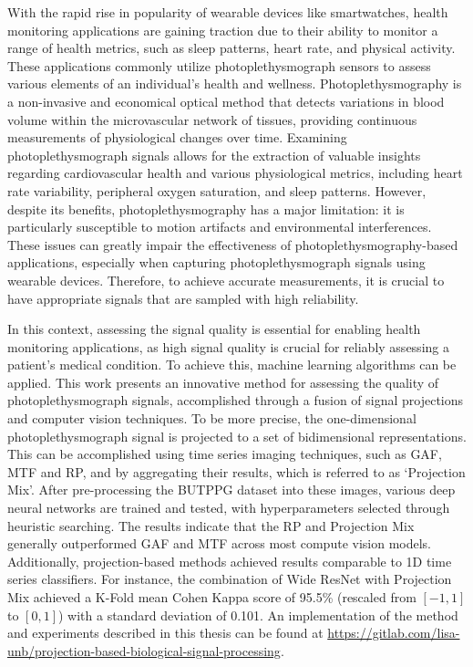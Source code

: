 

With the rapid rise in popularity of wearable devices like smartwatches, health monitoring applications are gaining traction due to their ability to monitor a range of health metrics, such as sleep patterns, heart rate, and physical activity. These applications commonly utilize photoplethysmograph sensors to assess various elements of an individual's health and wellness. Photoplethysmography is a non-invasive and economical optical method that detects variations in blood volume within the microvascular network of tissues, providing continuous measurements of physiological changes over time. Examining photoplethysmograph signals allows for the extraction of valuable insights regarding cardiovascular health and various physiological metrics, including heart rate variability, peripheral oxygen saturation, and sleep patterns. However, despite its benefits, photoplethysmography has a major limitation: it is particularly susceptible to motion artifacts and environmental interferences. These issues can greatly impair the effectiveness of photoplethysmography-based applications, especially when capturing photoplethysmograph signals using wearable devices. Therefore, to achieve accurate measurements, it is crucial to have appropriate signals that are sampled with high reliability.

In this context, assessing the signal quality is essential for enabling health monitoring applications, as high signal quality is crucial for reliably assessing a patient’s medical condition. To achieve this, machine learning algorithms can be applied. This work presents an innovative method for assessing the quality of photoplethysmograph signals, accomplished through a fusion of signal projections and computer vision techniques. To be more precise, the one-dimensional photoplethysmograph signal is projected to a set of bidimensional representations. This can be accomplished using time series imaging techniques, such as \acrlong{GAF}, \acrlong{MTF} and \acrlong{RP}, and by aggregating their results, which is referred to as `Projection Mix'. After pre-processing the \acrlong	{BUTPPG} dataset into these images, various deep neural networks are trained and tested, with hyperparameters selected through heuristic searching. The results indicate that the \acrlong{RP} and Projection Mix generally outperformed \acrlong{GAF} and \acrlong{MTF} across most compute vision models. Additionally, projection-based methods achieved results comparable to 1D time series classifiers. For instance, the combination of Wide ResNet with Projection Mix achieved a K-Fold mean Cohen Kappa score of 95.5\% (rescaled from $[-1,1]$ to $[0,1]$) with a standard deviation of 0.101. An implementation of the method and experiments described in this thesis can be found at \url{https://gitlab.com/lisa-unb/projection-based-biological-signal-processing}.
